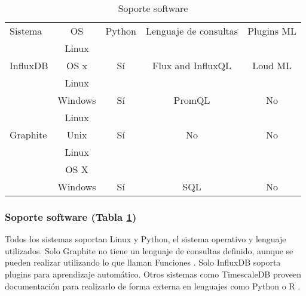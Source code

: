 \begin{table}[H]
    \begin{center}
        \begin{adjustbox}{max width=\textwidth}
            \begin{tabular}{l c c c c}
                \toprule
                Sistema & OS & Python & Lenguaje de consultas & Plugins ML\\
                \otoprule
                & Linux &                       &  \\
                \multirow{-2}{*}{InfluxDB} & OS x  & \multirow{-2}{*}{Sí} & \multirow{-2}{*}{Flux and InfluxQL} & \multirow{-2}{*}{Loud ML} \\
                \rowcolor{gray!35}
                                            & Linux   &                        & & \\
                \rowcolor{gray!35}
                \multirow{-2}{*}{Prometheus} & Windows & \multirow{-2}{*}{Sí}  & \multirow{-2}{*}{PromQL} & \multirow{-2}{*}{No}\\
                                        & Linux &                       &  & \\
                \multirow{-2}{*}{Graphite} & Unix  & \multirow{-2}{*}{Sí}  & \multirow{-2}{*}{No} & \multirow{-2}{*}{No} \\
                \rowcolor{gray!35}
                                            & Linux   &                             & & \\
                \rowcolor{gray!35}
                                            & OS X    &                             & & \\
                \rowcolor{gray!35}
                \multirow{-3}{*}{TimescaleDB} & Windows & \multirow{-3}{*}{Sí} & \multirow{-3}{*}{SQL} & \multirow{-3}{*}{No} \\
                \bottomrule
            \end{tabular}
        \end{adjustbox}
        \caption{Soporte software}
        \label{tabla:sssgbd}
    \end{center}
\end{table}

\subsubsection{Soporte software (Tabla \ref{tabla:sssgbd})} Todos los sistemas soportan Linux y Python, el sistema operativo 
y lenguaje utilizados. Solo Graphite no tiene un lenguaje de consultas definido, aunque se pueden realizar utilizando lo que 
llaman Funciones \cite{graphite-functions}. Solo InfluxDB soporta plugins para aprendizaje automático. Otros sistemas como
TimescaleDB proveen documentación para realizarlo de forma externa en lenguajes como Python o R \cite{timescale-forecasting}.

